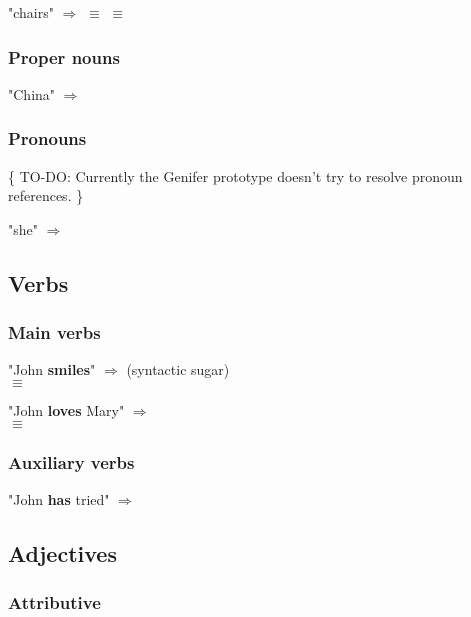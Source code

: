 "chairs" $\Longrightarrow$  $\equiv$  $\equiv$ 

\subsubsection{Proper nouns}

"China" $\Longrightarrow$ 

\subsubsection{Pronouns}

\{ TO-DO:  Currently the Genifer prototype doesn't try to resolve pronoun references. \}

"she" $\Longrightarrow$ 

\subsection{Verbs}

\subsubsection{Main verbs}

"John \textbf{smiles}" $\Longrightarrow$  \hspace*{0.5cm} (syntactic sugar) \\
\hspace*{1cm} $\equiv$ 

"John \textbf{loves} Mary" $\Longrightarrow$  \\
\hspace*{1cm} $\equiv$ 

\subsubsection{Auxiliary verbs}

"John \textbf{has} tried" $\Longrightarrow$ 

\subsection{Adjectives}

\subsubsection{Attributive}

